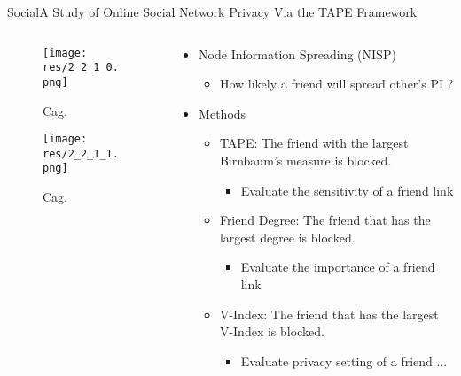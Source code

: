 \begin{frame}{Social}{A Study of Online Social Network Privacy Via the {TAPE} Framework \cite{yongbozeng_study_2015}}

	\begin{columns}
		\begin{column}{0.35\textwidth}
			\begin{center}
			
				\begin{figure}
					\texttt{[image: res/2\_2\_1\_0.png]}
					\caption{\label{fig:2_2_1_0}Cag.}
				\end{figure}
				
				\begin{figure}
					\texttt{[image: res/2\_2\_1\_1.png]}
					\caption{\label{fig:2_2_1_1}Cag.}
				\end{figure}
				
			\end{center}
		\end{column}
		
		\begin{column}{0.65\textwidth}
		
			\begin{itemize}
				\item Node Information Spreading (NISP)
					\begin{itemize}
						\item How likely a friend will spread other's PI ? 
					\end{itemize}
					
				\item Methods
					\begin{itemize}
						\item TAPE: The friend with the largest Birnbaum's measure is blocked.
							\begin{itemize}
								\item Evaluate the sensitivity of a friend link
							\end{itemize}
					

						\item Friend Degree: The friend that has the largest degree is blocked.
							\begin{itemize}
								\item Evaluate the importance of a friend link
							\end{itemize}
					

						\item V-Index: The friend that has the largest V-Index is blocked.
							\begin{itemize}
								\item Evaluate privacy setting of a friend ...
							\end{itemize}
					


\end{itemize}
\end{itemize}
\end{column}
\end{columns}
\end{frame}
